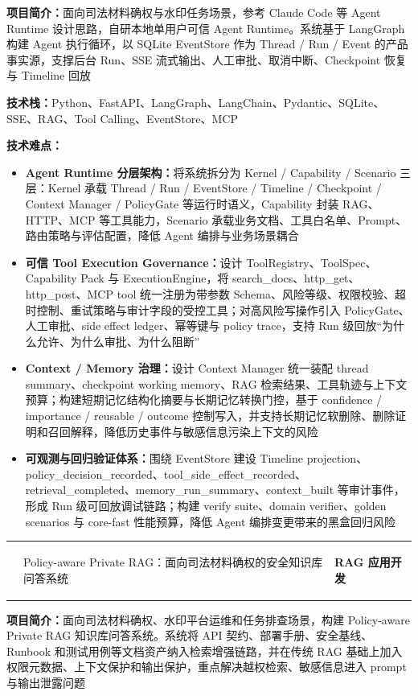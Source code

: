 \documentclass[9pt,a4paper]{ctexart}
\makeatletter
\newcommand{\ResumeBodySize}{\fontsize{8.35pt}{9.20pt}\selectfont}
\newcommand{\ResumeSmallSize}{\fontsize{7.95pt}{8.75pt}\selectfont}
\newcommand{\ResumeEntrySize}{\fontsize{8.65pt}{9.35pt}\selectfont}
\newcommand{\LeftDateWidth}{3.30cm}
\newcommand{\RightMetaWidth}{4.05cm}
\newcommand{\resumeSubheading}[4]{%
  \vspace{-0.01em}%
  \begingroup
  \renewcommand{\tabularxcolumn}[1]{m{##1}}%
  \begin{tabularx}{\linewidth}{@{}>{\ResumeSmallSize\bfseries\color{metagray}\arraybackslash}m{\LeftDateWidth}>{\ResumeEntrySize\bfseries\raggedright\arraybackslash}X>{\ResumeSmallSize\bfseries\color{metagray}\raggedleft\arraybackslash}m{\RightMetaWidth}@{}}
    #1 & #2 & #3 \\
  \end{tabularx}%
  \endgroup
  \ifthenelse{\equal{#4}{}}{}{%
    \vspace{-0.14em}%
    {\ResumeSmallSize\color{metagray}\hspace{\LeftDateWidth}#4\par}%
  }%
  \vspace{-0.05em}%
}
\newenvironment{resumeItemList}{%
  \begin{itemize}[leftmargin=1.05em,itemsep=-0.06em,topsep=-0.02em,parsep=0pt,partopsep=0pt]
  \ResumeBodySize
}{%
  \end{itemize}\vspace{-0.10em}
}
\newcommand{\resumeItem}[1]{\item #1}
\newcommand{\resumePlainLine}[1]{{\ResumeBodySize #1\par}}
\makeatother
\begin{document}
\resumePlainLine{\textbf{项目简介：}面向司法材料确权与水印任务场景，参考 Claude Code 等 Agent Runtime 设计思路，自研本地单用户可信 Agent Runtime。系统基于 LangGraph 构建 Agent 执行循环，以 SQLite EventStore 作为 Thread / Run / Event 的产品事实源，支撑后台 Run、SSE 流式输出、人工审批、取消中断、Checkpoint 恢复与 Timeline 回放}

\resumePlainLine{\textbf{技术栈：}Python、FastAPI、LangGraph、LangChain、Pydantic、SQLite、SSE、RAG、Tool Calling、EventStore、MCP}

\resumePlainLine{\textbf{技术难点：}}
\begin{resumeItemList}
\resumeItem{\textbf{Agent Runtime 分层架构：}将系统拆分为 Kernel / Capability / Scenario 三层：Kernel 承载 Thread / Run / EventStore / Timeline / Checkpoint / Context Manager / PolicyGate 等运行时语义，Capability 封装 RAG、HTTP、MCP 等工具能力，Scenario 承载业务文档、工具白名单、Prompt、路由策略与评估配置，降低 Agent 编排与业务场景耦合}

\resumeItem{\textbf{可信 Tool Execution Governance：}设计 ToolRegistry、ToolSpec、Capability Pack 与 ExecutionEngine，将 search\_docs、http\_get、http\_post、MCP tool 统一注册为带参数 Schema、风险等级、权限校验、超时控制、重试策略与审计字段的受控工具；对高风险写操作引入 PolicyGate、人工审批、side effect ledger、幂等键与 policy trace，支持 Run 级回放“为什么允许、为什么审批、为什么阻断”}

\resumeItem{\textbf{Context / Memory 治理：}设计 Context Manager 统一装配 thread summary、checkpoint working memory、RAG 检索结果、工具轨迹与上下文预算；构建短期记忆结构化摘要与长期记忆转换门控，基于 confidence / importance / reusable / outcome 控制写入，并支持长期记忆软删除、删除证明和召回解释，降低历史事件与敏感信息污染上下文的风险}

\resumeItem{\textbf{可观测与回归验证体系：}围绕 EventStore 建设 Timeline projection、policy\_decision\_recorded、tool\_side\_effect\_recorded、retrieval\_completed、memory\_run\_summary、context\_built 等审计事件，形成 Run 级可回放调试链路；构建 verify suite、domain verifier、golden scenarios 与 core-fast 性能预算，降低 Agent 编排变更带来的黑盒回归风险}
\end{resumeItemList}
\vspace{0.08em}

\resumeSubheading
{}
{Policy-aware Private RAG：面向司法材料确权的安全知识库问答系统}
{RAG 应用开发}
{2026.01--2026.03}

\resumePlainLine{\textbf{项目简介：}面向司法材料确权、水印平台运维和任务排查场景，构建 Policy-aware Private RAG 知识库问答系统。系统将 API 契约、部署手册、安全基线、Runbook 和测试用例等文档资产纳入检索增强链路，并在传统 RAG 基础上加入权限元数据、上下文保护和输出保护，重点解决越权检索、敏感信息进入 prompt 与输出泄露问题}
\end{document}
